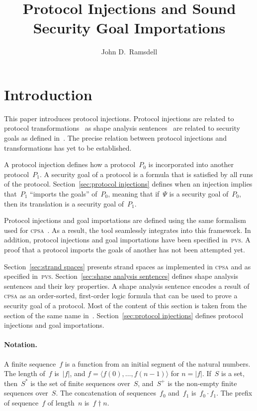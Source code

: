 \documentclass[12pt]{article}
\title{Protocol Injections and Sound\\ Security Goal Importations}
\author{John D.\ Ramsdell}
\newcommand{\cpsa}{\textsc{cpsa}}
\newcommand{\pvs}{\textsc{pvs}}
\newcommand{\seq}[1]{\ensuremath{\langle#1\rangle}}
\newcommand{\prefix}[2]{#1\dagger#2}
\newcommand{\append}{\cdot}
\begin{document}
\maketitle

\section{Introduction}

This paper introduces protocol injections.  Protocol injections are
related to protocol transformations~\cite{Guttman12a} as shape
analysis sentences~\cite{Ramsdell12} are related to security goals as
defined in~\cite{Guttman12a}.  The precise relation between protocol
injections and transformations has yet to be established.

A protocol injection defines how a protocol~$P_0$ is incorporated into
another protocol~$P_1$.  A security goal of a protocol is a formula
that is satisfied by all runs of the protocol.
Section~\ref{sec:protocol injections} defines when an injection
implies that~$P_1$ ``imports the goals'' of~$P_0$, meaning that if~$\Psi$
is a security goal of~$P_0$, then its translation is a security goal
of~$P_1$.

Protocol injections and goal importations are defined using the same
formalism used for {\cpsa}~\cite{cpsaspec09}.  As a result, the tool
seamlessly integrates into this framework.  In addition, protocol
injections and goal importations have been specified in~{\pvs}.  A
proof that a protocol imports the goals of another has not been
attempted yet.

Section~\ref{sec:strand spaces} presents strand spaces as implemented
in {\cpsa} and as specified in~{\pvs}.  Section~\ref{sec:shape
  analysis sentences} defines shape analysis sentences and their key
properties.  A shape analysis sentence encodes a result of {\cpsa}
as an order-sorted, first-order logic formula that can be used to
prove a security goal of a protocol.  Most of the content of this
section is taken from the section of the same name
in~\cite{Ramsdell12}.  Section~\ref{sec:protocol injections} defines
protocol injections and goal importations.

\paragraph{Notation.}

A finite sequence~$f$ is a function from an initial segment of the
natural numbers.  The length of~$f$ is~$|f|$, and $f=\seq{f(0),\ldots,
  f(n-1)}$ for $n=|f|$.  If~$S$ is a set, then~$S^\ast$ is the set of
finite sequences over~$S$, and~$S^+$ is the non-empty finite sequences
over~$S$.  The concatenation of sequences~$f_0$ and~$f_1$
is~$f_0\append f_1$.  The prefix of sequence~$f$ of length~$n$
is~$\prefix{f}{n}$.
\end{document}

